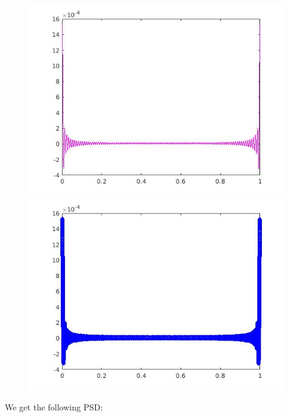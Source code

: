 \documentclass[a4paper,11pt]{article}
\begin{document}
\begin{figure}[!hp]
\centering
\begin{minipage}{.5\textwidth}
  \centering
  \includegraphics[width=1\linewidth]{images/lab1_9.jpg}
\end{minipage}%
\begin{minipage}{.5\textwidth}
  \centering
  \includegraphics[width=1\linewidth]{images/lab1_10.jpg}
\end{minipage}
\end{figure}

We get the following PSD:
\end{document}
